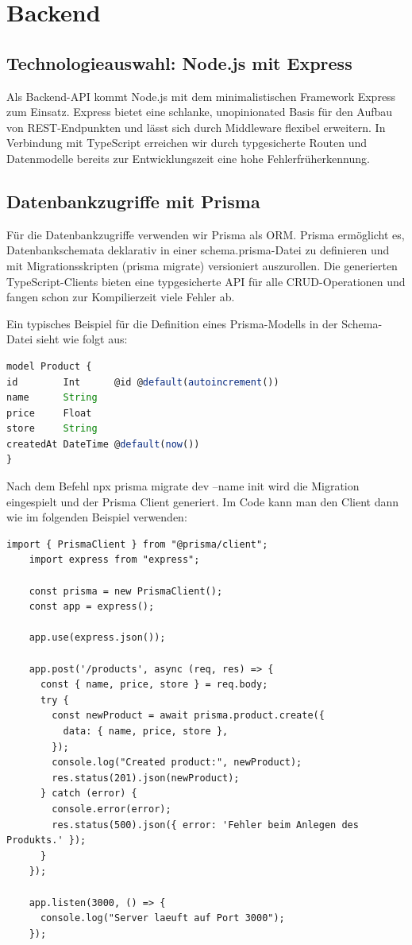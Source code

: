 \documentclass[12pt, a4paper]{report} %
\begin{document}
\section{Backend}
\subsection{Technologieauswahl: Node.js mit Express}
Als Backend-API kommt Node.js mit dem minimalistischen Framework Express zum Einsatz. Express bietet eine schlanke, unopinionated Basis für den Aufbau von REST-Endpunkten und lässt sich durch Middleware flexibel erweitern. In Verbindung mit TypeScript erreichen wir durch typgesicherte Routen und Datenmodelle bereits zur Entwicklungszeit eine hohe Fehlerfrüherkennung.

\subsection{Datenbankzugriffe mit Prisma}
Für die Datenbankzugriffe verwenden wir Prisma als ORM. Prisma ermöglicht es, Datenbankschemata deklarativ in einer schema.prisma-Datei zu definieren und mit Migrationsskripten (prisma migrate) versioniert auszurollen. Die generierten TypeScript-Clients bieten eine typgesicherte API für alle CRUD-Operationen und fangen schon zur Kompilierzeit viele Fehler ab.

Ein typisches Beispiel für die Definition eines Prisma-Modells in der Schema-Datei sieht wie folgt aus:

\begin{lstlisting}[language=TypeScript,caption={Schema-Definition mit Prisma}]
model Product {
id        Int      @id @default(autoincrement())
name      String
price     Float
store     String
createdAt DateTime @default(now())
}
\end{lstlisting}

Nach dem Befehl npx prisma migrate dev --name init wird die Migration eingespielt und der Prisma Client generiert. Im Code kann man den Client dann wie im folgenden Beispiel verwenden:

\begin{lstlisting}[style=typescriptstyle,caption={Beispielhafte Verwendung des Prisma Client}]
    import { PrismaClient } from "@prisma/client";
    import express from "express";
    
    const prisma = new PrismaClient();
    const app = express();
    
    app.use(express.json());
    
    app.post('/products', async (req, res) => {
      const { name, price, store } = req.body;
      try {
        const newProduct = await prisma.product.create({
          data: { name, price, store },
        });
        console.log("Created product:", newProduct);
        res.status(201).json(newProduct);
      } catch (error) {
        console.error(error);
        res.status(500).json({ error: 'Fehler beim Anlegen des Produkts.' });
      }
    });
    
    app.listen(3000, () => {
      console.log("Server laeuft auf Port 3000");
    });
    \end{lstlisting}
\end{document}
